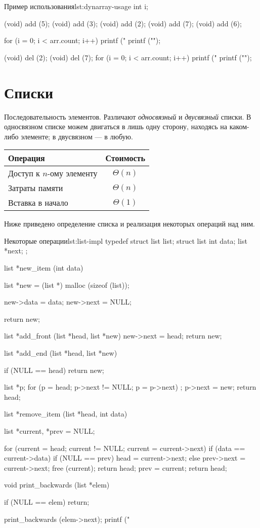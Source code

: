 \begin{clst}{Пример использования}{lst:dynarray-usage}
int i;

(void) add (5);
(void) add (3);
(void) add (2);
(void) add (7);
(void) add (6);

for (i = 0; i < arr.count; i++)
  printf ("%
printf ("\n");

(void) del (2);
(void) del (7);
for (i = 0; i < arr.count; i++)
  printf ("%
printf ("\n");
\end{clst}

\section{Списки}
\label{sec:lists}

Последовательность элементов. Различают \emph{односвязный} и \emph{двусвязный} списки. В односвязном списке можем двигаться в лишь одну сторону, находясь на каком-либо элементе; в двусвязном --- в любую.
\begin{center}
  \begin{tabular}{lc}
    \toprule
    Операция & Стоимость \\
    \midrule
    Доступ к $n$-ому элементу & $\Theta(n)$ \\
    Затраты памяти & $\Theta(n)$ \\
    Вставка в начало & $\Theta(1)$ \\
    \bottomrule
  \end{tabular}
\end{center}

Ниже приведено определение списка и реализация некоторых операций над ним.

\begin{clst}{Некоторые операции}{lst:list-impl}
typedef struct list list;
struct list {
  int data;
  list *next;
};

list *new_item (int data) {
  list *new = (list *) malloc (sizeof (list));

  new->data = data;
  new->next = NULL;

  return new;
}

list *add_front (list *head, list *new) {
  new->next = head;
  return new;
}

list *add_end (list *head, list *new) {
  if (NULL == head)
    return new;

  list *p;
  for (p = head; p->next != NULL; p = p->next)
    ;
  p->next = new;
  return head;
}

list *remove_item (list *head, int data) {
  list *current, *prev = NULL;

  for (current = head; current != NULL; current = current->next) {
    if (data == current->data) {
      if (NULL == prev)
	head = current->next;
      else
	prev->next = current->next;
      free (current);
      return head;
    }
    prev = current;
  }
  return head;
}

void print_backwards (list *elem) {
  if (NULL == elem)
    return;

  print_backwards (elem->next);
  printf ("%
}
\end{clst}


